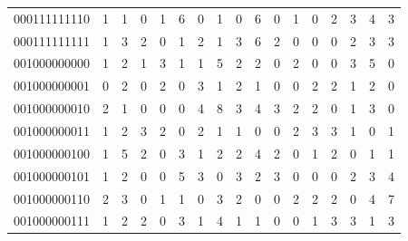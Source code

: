 \documentclass[10pt,a4paper]{article}
\begin{document}
\begin{longtable}{ |c|c|c|c|c|c|c|c|c|c|c|c|c|c|c|c|c| }
    000111111110              & 1                            & 1                                & 0                            & 1                              & 6   & 0   & 1   & 0   & 6   & 0   & 1   & 0   & 2   & 3   & 4   & 3   \\
    000111111111              & 1                            & 3                                & 2                            & 0                              & 1   & 2   & 1   & 3   & 6   & 2   & 0   & 0   & 0   & 2   & 3   & 3   \\
    001000000000              & 1                            & 2                                & 1                            & 3                              & 1   & 1   & 5   & 2   & 2   & 0   & 2   & 0   & 0   & 3   & 5   & 0   \\
    001000000001              & 0                            & 2                                & 0                            & 2                              & 0   & 3   & 1   & 2   & 1   & 0   & 0   & 2   & 2   & 1   & 2   & 0   \\
    001000000010              & 2                            & 1                                & 0                            & 0                              & 0   & 4   & 8   & 3   & 4   & 3   & 2   & 2   & 0   & 1   & 3   & 0   \\
    001000000011              & 1                            & 2                                & 3                            & 2                              & 0   & 2   & 1   & 1   & 0   & 0   & 2   & 3   & 3   & 1   & 0   & 1   \\
    001000000100              & 1                            & 5                                & 2                            & 0                              & 3   & 1   & 2   & 2   & 4   & 2   & 0   & 1   & 2   & 0   & 1   & 1   \\
    001000000101              & 1                            & 2                                & 0                            & 0                              & 5   & 3   & 0   & 3   & 2   & 3   & 0   & 0   & 0   & 2   & 3   & 4   \\
    001000000110              & 2                            & 3                                & 0                            & 1                              & 1   & 0   & 3   & 2   & 0   & 0   & 2   & 2   & 2   & 0   & 4   & 7   \\
    001000000111              & 1                            & 2                                & 2                            & 0                              & 3   & 1   & 4   & 1   & 1   & 0   & 0   & 1   & 3   & 3   & 1   & 3   \\

\end{longtable}
\end{document}
